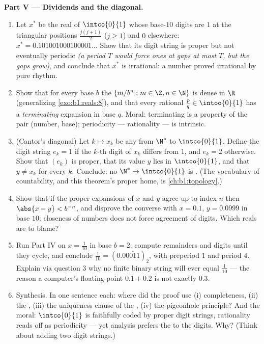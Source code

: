 \begin{problem}
\medskip
\noindent\textbf{Part V --- Dividends and the diagonal.}
\begin{enumerate}[resume]
  \item Let $x^*$ be the real of $\intco{0}{1}$ whose base-$10$
        digits are $1$ at the triangular positions $\frac{j(j +
        1)}{2}$ ($j \geq 1$) and $0$ elsewhere: $x^* =
        0.101001000100001\dots$ Show that its digit string is
        proper but not eventually periodic \emph{(a period $T$
        would force ones at gaps at most $T$, but the gaps grow)},
        and conclude that $x^*$ is irrational: a number proved
        irrational by pure rhythm.
  \item Show that for every base $b$ the  $\{m/b^n : m \in \Z,
        n \in \N\}$ is dense in $\R$ (generalizing
        \cref{exo:b1:reals:8}), and that every rational $\frac pq
        \in \intoo{0}{1}$ has a \emph{terminating} expansion in
        base $q$. Moral: terminating is a property of the pair
        (number, base); periodicity --- rationality --- is
        intrinsic.
  \item (Cantor's diagonal) Let $k \mapsto x_k$ be any  from
        $\N^*$ to $\intco{0}{1}$. Define the digit string $e_k =
        1$ if the $k$-th digit of $x_k$ differs from $1$, and
        $e_k = 2$ otherwise. Show that $(e_k)$ is proper, that
        its value $y$ lies in $\intco{0}{1}$, and that $y \neq
        x_k$ for every $k$. Conclude: no  $\N^* \to
        \intco{0}{1}$ is . (The vocabulary of
        countability, and this theorem's proper home, is
        \cref{ch:b1:topology}.)
  \item Show that if the proper expansions of $x$ and $y$ agree
        up to index $n$ then $\abs{x - y} < b^{-n}$, and disprove
        the converse with $x = 0.1$, $y = 0.0999$ in base $10$:
        closeness of numbers does not force agreement of digits.
        Which reals are to blame?
  \item Run Part IV on $x = \frac{1}{10}$ in base $b = 2$:
        compute remainders and digits until they cycle, and
        conclude $\frac{1}{10} = (0.0\overline{0011})_2$, with
        preperiod $1$ and period $4$. Explain via question 3 why
        no finite binary string will ever equal $\frac{1}{10}$
        --- the reason a computer's floating-point $0.1 + 0.2$ is
        not exactly $0.3$.
  \item Synthesis. In one sentence each: where did the proof use
        (i) completeness, (ii) the , (iii)
        the uniqueness clause of the , (iv) the pigeonhole
        principle? And the moral: $\intco{0}{1}$ is faithfully
        coded by proper digit strings, rationality reads off as
        periodicity --- yet analysis prefers the  to the
        digits. Why? (Think about adding two digit strings.)
\end{enumerate}
\end{problem}

